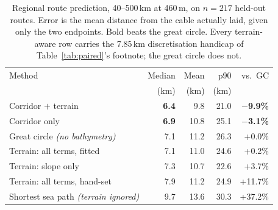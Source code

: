 \begin{table}[t]
\caption{Regional route prediction, 40--500\,km at 460\,m, on
$n=217$ held-out routes. Error is the mean distance from the cable
actually laid, given only the two endpoints. Bold beats the great circle.
Every terrain-aware row carries the 7.85\,km discretisation
handicap of Table~\ref{tab:paired}'s footnote; the great circle does not.}
\label{tab:prediction}
\centering\footnotesize
\begin{tabular}{@{}lrrrr@{}}
\toprule
Method & Median & Mean & p90 & vs.\ GC \\
 & (km) & (km) & (km) & \\
\midrule
Corridor $+$ terrain & \textbf{6.4} & 9.8 & 21.0 & \textbf{\ensuremath{-}9.9\%} \\
Corridor only & \textbf{6.9} & 10.8 & 25.1 & \textbf{\ensuremath{-}3.1\%} \\
Great circle \textit{(no bathymetry)} & 7.1 & 11.2 & 26.3 & +0.0\% \\
Terrain: all terms, fitted & 7.1 & 11.0 & 24.6 & +0.2\% \\
Terrain: slope only & 7.3 & 10.7 & 22.6 & +3.7\% \\
Terrain: all terms, hand-set & 7.9 & 11.2 & 24.9 & +11.7\% \\
Shortest sea path \textit{(terrain ignored)} & 9.7 & 13.6 & 30.3 & +37.2\% \\
\bottomrule
\end{tabular}
\end{table}
